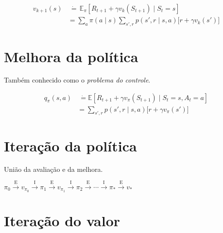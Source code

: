 \documentclass{article}
\begin{document}
        \begin{equation}
            \begin{split}
                v_{k+1}(s) & \ \dot{=} \, \mathbb{E}_{\pi} \left[ R_{t+1} + \gamma v_k(S_{t+1}) \mid S_t = s \right] \\
                & = \sum_a \pi(a \mid s) \sum_{s',r} p(s',r \mid s,a) \Big[ r + \gamma v_k(s') \Big]
            \end{split}
        \end{equation}
        
    \section{Melhora da política}
    
        Também conhecido como o \textit{problema do controle}.
        
        \begin{equation}
            \begin{split}
                q_{\pi}(s,a) & \ \dot{=} \mathbb{E} \left[ R_{t+1} + \gamma v_{\pi}(S_{t+1}) \mid S_t = s, A_t = a \right] \\
                & = \sum_{s',r} p(s', r \mid s, a) \Big[ r + \gamma v_{\pi}(s') \Big]
            \end{split}
        \end{equation}
    
    \section{Iteração da política}
    
        União da avaliação e da melhora.
        
        \begin{center}
            \begin{math}
                \pi_0 \xrightarrow{\ \textrm{E} \ } 
                v_{\pi_0} \xrightarrow{\ \textrm{I} \ } 
                \pi_1 \xrightarrow{\ \textrm{E} \ } 
                v_{\pi_1} \xrightarrow{\ \textrm{I} \ } 
                \pi_2 \xrightarrow{\ \textrm{E} \ } 
                \cdots \xrightarrow{\ \textrm{I} \ }
                \pi_* \xrightarrow{\ \textrm{E} \ } v_{*}
            \end{math}
        \end{center}
        
    \section{Iteração do valor}
    
\end{document}
